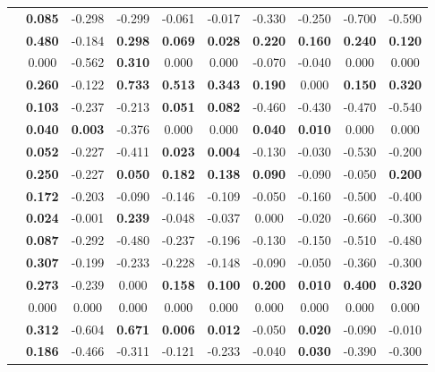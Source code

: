 \begin{table}
\begin{tabular}{p{3cm}c|cccc|cccc}
		\centering{Cervical Myelopathy} & \textbf{0.085} &  -0.298 &  -0.299 &  -0.061 &  -0.017 &  -0.330 &  -0.250 &  -0.700 &  -0.590 \\
		\centering{Drones in Agriculture} & \textbf{0.480} &  -0.184 & \textbf{0.298} & \textbf{0.069} & \textbf{0.028} & \textbf{0.220} & \textbf{0.160} & \textbf{0.240} & \textbf{0.120} \\
		\centering{Tourism Growth Nexus} & 0.000 &  -0.562 & \textbf{0.310} & 0.000 & 0.000 &  -0.070 &  -0.040 & 0.000 & 0.000 \\
		\centering{Sustainable Biofuel Economy} & \textbf{0.260} &  -0.122 & \textbf{0.733} & \textbf{0.513} & \textbf{0.343} & \textbf{0.190} & 0.000 & \textbf{0.150} & \textbf{0.320} \\
		\centering{Perovskite Solar Cells Stability} & \textbf{0.103} &  -0.237 &  -0.213 & \textbf{0.051} & \textbf{0.082} &  -0.460 &  -0.430 &  -0.470 &  -0.540 \\
		\centering{Nanopharmaceuticals OR Nanonutraceuticals} & \textbf{0.040} & \textbf{0.003} &  -0.376 & 0.000 & 0.000 & \textbf{0.040} & \textbf{0.010} & 0.000 & 0.000 \\
		\centering{Green Warehousing} & \textbf{0.052} &  -0.227 &  -0.411 & \textbf{0.023} & \textbf{0.004} &  -0.130 &  -0.030 &  -0.530 &  -0.200 \\
		\centering{AI on Edge Devices} & \textbf{0.250} &  -0.227 & \textbf{0.050} & \textbf{0.182} & \textbf{0.138} & \textbf{0.090} &  -0.090 &  -0.050 & \textbf{0.200} \\
		\centering{Internet of Things in Healthcare} & \textbf{0.172} &  -0.203 &  -0.090 &  -0.146 &  -0.109 &  -0.050 &  -0.160 &  -0.500 &  -0.400 \\
		\centering{Software Process Line} & \textbf{0.024} &  -0.001 & \textbf{0.239} &  -0.048 &  -0.037 & 0.000 &  -0.020 &  -0.660 &  -0.300 \\
		\centering{Data Stream Processing Latency} & \textbf{0.087} &  -0.292 &  -0.480 &  -0.237 &  -0.196 &  -0.130 &  -0.150 &  -0.510 &  -0.480 \\
		\centering{Business Process Meta Models} & \textbf{0.307} &  -0.199 &  -0.233 &  -0.228 &  -0.148 &  -0.090 &  -0.050 &  -0.360 &  -0.300 \\
		\centering{Multicore Performance Prediction} & \textbf{0.273} &  -0.239 & 0.000 & \textbf{0.158} & \textbf{0.100} & \textbf{0.200} & \textbf{0.010} & \textbf{0.400} & \textbf{0.320} \\
		\centering{Cloud Migration} & 0.000 & 0.000 & 0.000 & 0.000 & 0.000 & 0.000 & 0.000 & 0.000 & 0.000 \\
		\centering{Software Fault Prediction Metrics} & \textbf{0.312} &  -0.604 & \textbf{0.671} & \textbf{0.006} & \textbf{0.012} &  -0.050 & \textbf{0.020} &  -0.090 &  -0.010 \\
		\centering{Software Defect Prediction} & \textbf{0.186} &  -0.466 &  -0.311 &  -0.121 &  -0.233 &  -0.040 & \textbf{0.030} &  -0.390 &  -0.300 \\
	\end{tabular}\label{table:expirment-1}
\end{table}


